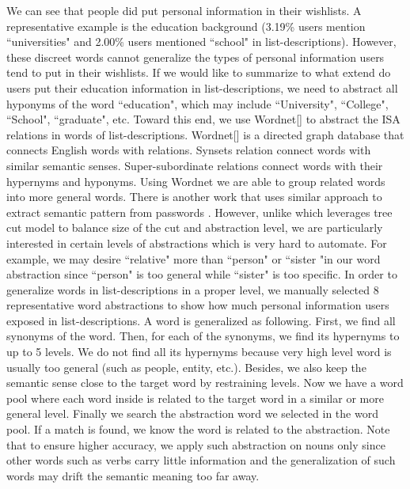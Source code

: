 We can see that people did put personal information in their wishlists. A representative example is the education background (3.19\% users mention ``universities" and 2.00\% users mentioned ``school" in list-descriptions). However, these discreet words cannot generalize the types of personal information users tend to put in their wishlists. If we would like to summarize to what extend do users put their education information in list-descriptions, we need to abstract all hyponyms of the word ``education", which may include ``University", ``College", ``School", ``graduate", etc. Toward this end, we use Wordnet[] to abstract the ISA relations in words of list-descriptions. Wordnet[] is a directed graph database that connects English words with relations. Synsets relation connect words with similar semantic senses. Super-subordinate relations connect words with their hypernyms and hyponyms. Using Wordnet we are able to group related words into more general words. There is another work that uses similar approach to extract semantic pattern from passwords \cite{veras2014semantic}. However, unlike \cite{veras2014semantic} which leverages tree cut model \cite{li1998generalizing} to balance size of the cut and abstraction level, we are particularly interested in certain levels of abstractions which is very hard to automate. For example, we may desire ``relative" more than ``person" or ``sister "in our word abstraction since ``person" is too general while ``sister" is too specific. In order to generalize words in list-descriptions in a proper level, we manually selected 8 representative word abstractions to show how much personal information users exposed in list-descriptions. A word is generalized as following. First, we find all synonyms of the word. Then, for each of the synonyms, we find its hypernyms to up to 5 levels. We do not find all its hypernyms because very high level word is usually too general (such as people, entity, etc.). Besides, we also keep the semantic sense close to the target word by restraining levels. Now we have a word pool where each word inside is related to the target word in a similar or more general level. Finally we search the abstraction word we selected in the word pool. If a match is found, we know the word is related to the abstraction. Note that to ensure higher accuracy, we apply such abstraction on nouns only since other words such as verbs carry little information and the generalization of such words may drift the semantic meaning too far away. 


